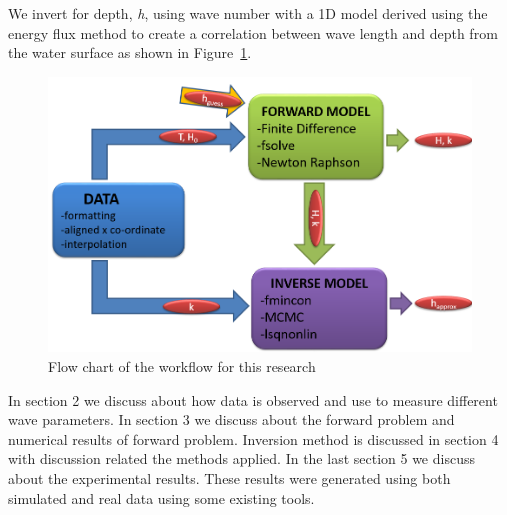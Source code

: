 We invert for depth, \textit{h}, using wave number with a 1D model derived using the energy flux method to create a correlation between wave length and depth from the water surface as shown in Figure~\ref{flowchart}.
\begin{figure}[H]
		\centering
		\includegraphics[width=.90\linewidth]{img/Flow_Chart.png}
		\caption{Flow chart of the workflow for this research}
		\label{flowchart}
\end{figure}
In section 2 we discuss about how data is observed and use to measure different wave parameters. In section 3 we discuss about the forward problem and numerical results of forward problem. Inversion method is discussed in section 4 with discussion related the methods applied. In the last section 5 we discuss about the experimental results. These results were generated using both simulated and real data using some existing tools.